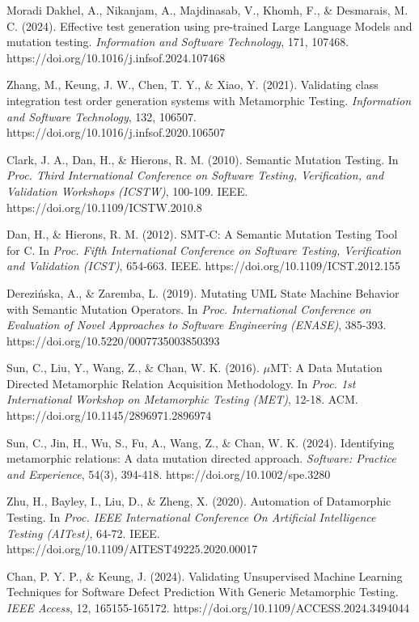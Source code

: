 \documentclass[review,12pt,authoryear]{elsarticle}
\begin{document}
Moradi Dakhel, A., Nikanjam, A., Majdinasab, V., Khomh, F., \&
Desmarais, M. C. (2024). Effective test generation using pre-trained
Large Language Models and mutation testing. \emph{Information and
Software Technology}, 171, 107468.
https://doi.org/10.1016/j.infsof.2024.107468

Zhang, M., Keung, J. W., Chen, T. Y., \& Xiao, Y. (2021). Validating
class integration test order generation systems with Metamorphic
Testing. \emph{Information and Software Technology}, 132, 106507.
https://doi.org/10.1016/j.infsof.2020.106507

Clark, J. A., Dan, H., \& Hierons, R. M. (2010). Semantic Mutation
Testing. In \emph{Proc. Third International Conference on Software
Testing, Verification, and Validation Workshops (ICSTW)}, 100-109. IEEE.
https://doi.org/10.1109/ICSTW.2010.8

Dan, H., \& Hierons, R. M. (2012). SMT-C: A Semantic Mutation Testing
Tool for C. In \emph{Proc. Fifth International Conference on Software
Testing, Verification and Validation (ICST)}, 654-663. IEEE.
https://doi.org/10.1109/ICST.2012.155

Derezińska, A., \& Zaremba, L. (2019). Mutating UML State Machine
Behavior with Semantic Mutation Operators. In \emph{Proc. International
Conference on Evaluation of Novel Approaches to Software Engineering
(ENASE)}, 385-393. https://doi.org/10.5220/0007735003850393

Sun, C., Liu, Y., Wang, Z., \& Chan, W. K. (2016). $\mu$MT: A Data Mutation
Directed Metamorphic Relation Acquisition Methodology. In \emph{Proc.
1st International Workshop on Metamorphic Testing (MET)}, 12-18. ACM.
https://doi.org/10.1145/2896971.2896974

Sun, C., Jin, H., Wu, S., Fu, A., Wang, Z., \& Chan, W. K. (2024).
Identifying metamorphic relations: A data mutation directed approach.
\emph{Software: Practice and Experience}, 54(3), 394-418.
https://doi.org/10.1002/spe.3280

Zhu, H., Bayley, I., Liu, D., \& Zheng, X. (2020). Automation of
Datamorphic Testing. In \emph{Proc. IEEE International Conference On
Artificial Intelligence Testing (AITest)}, 64-72. IEEE.
https://doi.org/10.1109/AITEST49225.2020.00017

Chan, P. Y. P., \& Keung, J. (2024). Validating Unsupervised Machine
Learning Techniques for Software Defect Prediction With Generic
Metamorphic Testing. \emph{IEEE Access}, 12, 165155-165172.
https://doi.org/10.1109/ACCESS.2024.3494044
\end{document}
